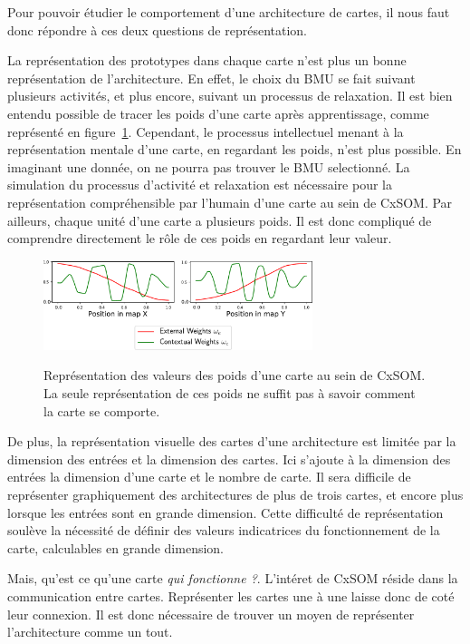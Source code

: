 Pour pouvoir étudier le comportement d'une architecture de cartes, il nous faut donc répondre à ces deux questions de représentation. 

La représentation des prototypes dans chaque carte n'est plus un bonne représentation de l'architecture.
En effet, le choix du BMU se fait suivant plusieurs activités, et plus encore, suivant un processus de relaxation. Il est bien entendu possible de tracer les poids d'une carte après apprentissage, comme représenté en figure~\ref{fig:weights}. Cependant, le processus intellectuel menant à la représentation mentale d'une carte, en regardant les poids, n'est plus possible. En imaginant une donnée, on ne pourra pas trouver le BMU selectionné. La simulation du processus d'activité et relaxation est nécessaire pour la représentation compréhensible par l'humain d'une carte au sein de CxSOM. Par ailleurs, chaque unité d'une carte a plusieurs poids. Il est donc compliqué de comprendre directement le rôle de ces poids en regardant leur valeur.
\begin{figure}
\centering
\includegraphics[width=0.7\textwidth]{weights_2.pdf}
\label{fig:weights}
\caption{Représentation des valeurs des poids d'une carte au sein de CxSOM. La seule représentation de ces poids ne suffit pas à savoir comment la carte se comporte. }
\end{figure}
De plus, la représentation visuelle des cartes d'une architecture est limitée par la dimension des entrées et la dimension des cartes. Ici s'ajoute à la dimension des entrées la dimension d'une carte et le nombre de carte. Il sera difficile de représenter graphiquement des architectures de plus de trois cartes, et encore plus lorsque les entrées sont en grande dimension. Cette difficulté de représentation soulève la nécessité de définir des valeurs indicatrices du fonctionnement de la carte, calculables en grande dimension.

Mais, qu'est ce qu'une carte \emph{qui fonctionne ?}. L'intéret de CxSOM réside dans la communication entre cartes. Représenter les cartes une à une laisse donc de coté leur connexion. Il est donc nécessaire de trouver un moyen de représenter l'architecture comme un tout.

